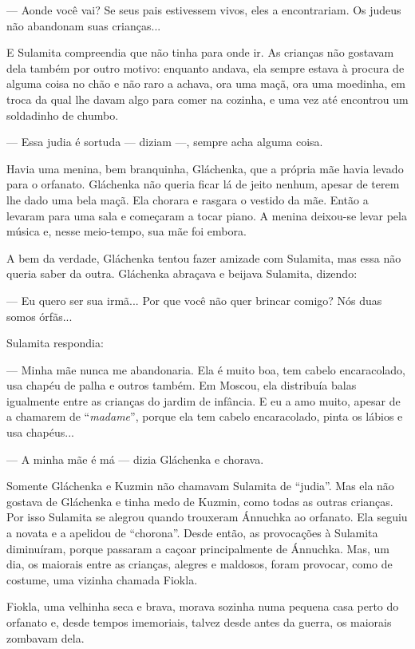--- Aonde você vai? Se seus pais estivessem vivos, eles a encontrariam.
Os judeus não abandonam suas crianças...

E Sulamita compreendia que não tinha para onde ir. As crianças não
gostavam dela também por outro motivo: enquanto andava, ela sempre
estava à procura de alguma coisa no chão e não raro a achava, ora uma
maçã, ora uma moedinha, em troca da qual lhe davam algo para comer na
cozinha, e uma vez até encontrou um soldadinho de chumbo.

--- Essa judia é sortuda --- diziam ---, sempre acha alguma coisa.

Havia uma menina, bem branquinha, Gláchenka, que a própria mãe havia
levado para o orfanato. Gláchenka não queria ficar lá de jeito nenhum,
apesar de terem lhe dado uma bela maçã. Ela chorara e rasgara o vestido
da mãe. Então a levaram para uma sala e começaram a tocar piano. A
menina deixou-se levar pela música e, nesse meio-tempo, sua mãe foi
embora.

A bem da verdade, Gláchenka tentou fazer amizade com Sulamita, mas essa
não queria saber da outra. Gláchenka abraçava e beijava Sulamita,
dizendo:

--- Eu quero ser sua irmã... Por que você não quer brincar comigo? Nós
duas somos órfãs...

Sulamita respondia:

--- Minha mãe nunca me abandonaria. Ela é muito boa, tem cabelo
encaracolado, usa chapéu de palha e outros também. Em Moscou, ela
distribuía balas igualmente entre as crianças do jardim de infância. E
eu a amo muito, apesar de a chamarem de ``\emph{madame}'', porque ela
tem cabelo encaracolado, pinta os lábios e usa chapéus...

--- A minha mãe é má --- dizia Gláchenka e chorava.

Somente Gláchenka e Kuzmin não chamavam Sulamita de ``judia''. Mas ela
não gostava de Gláchenka e tinha medo de Kuzmin, como todas as outras
crianças. Por isso Sulamita se alegrou quando trouxeram Ánnuchka ao
orfanato. Ela seguiu a novata e a apelidou de ``chorona''. Desde então,
as provocações à Sulamita diminuíram, porque passaram a caçoar
principalmente de Ánnuchka. Mas, um dia, os maiorais entre as crianças,
alegres e maldosos, foram provocar, como de costume, uma vizinha chamada
Fiokla.

Fiokla, uma velhinha seca e brava, morava sozinha numa pequena casa
perto do orfanato e, desde tempos imemoriais, talvez desde antes da
guerra, os maiorais zombavam dela.

